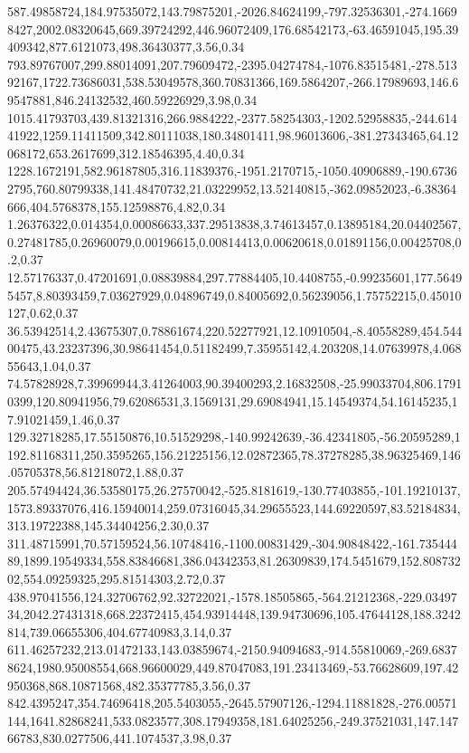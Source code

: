 587.49858724,184.97535072,143.79875201,-2026.84624199,-797.32536301,-274.16698427,2002.08320645,669.39724292,446.96072409,176.68542173,-63.46591045,195.39409342,877.6121073,498.36430377,3.56,0.34
793.89767007,299.88014091,207.79609472,-2395.04274784,-1076.83515481,-278.51392167,1722.73686031,538.53049578,360.70831366,169.5864207,-266.17989693,146.69547881,846.24132532,460.59226929,3.98,0.34
1015.41793703,439.81321316,266.9884222,-2377.58254303,-1202.52958835,-244.61441922,1259.11411509,342.80111038,180.34801411,98.96013606,-381.27343465,64.12068172,653.2617699,312.18546395,4.40,0.34
1228.1672191,582.96187805,316.11839376,-1951.2170715,-1050.40906889,-190.67362795,760.80799338,141.48470732,21.03229952,13.52140815,-362.09852023,-6.38364666,404.5768378,155.12598876,4.82,0.34
1.26376322,0.014354,0.00086633,337.29513838,3.74613457,0.13895184,20.04402567,0.27481785,0.26960079,0.00196615,0.00814413,0.00620618,0.01891156,0.00425708,0.2,0.37
12.57176337,0.47201691,0.08839884,297.77884405,10.4408755,-0.99235601,177.56495457,8.80393459,7.03627929,0.04896749,0.84005692,0.56239056,1.75752215,0.45010127,0.62,0.37
36.53942514,2.43675307,0.78861674,220.52277921,12.10910504,-8.40558289,454.54400475,43.23237396,30.98641454,0.51182499,7.35955142,4.203208,14.07639978,4.06855643,1.04,0.37
74.57828928,7.39969944,3.41264003,90.39400293,2.16832508,-25.99033704,806.17910399,120.80941956,79.62086531,3.1569131,29.69084941,15.14549374,54.16145235,17.91021459,1.46,0.37
129.32718285,17.55150876,10.51529298,-140.99242639,-36.42341805,-56.20595289,1192.81168311,250.3595265,156.21225156,12.02872365,78.37278285,38.96325469,146.05705378,56.81218072,1.88,0.37
205.57494424,36.53580175,26.27570042,-525.8181619,-130.77403855,-101.19210137,1573.89337076,416.15940014,259.07316045,34.29655523,144.69220597,83.52184834,313.19722388,145.34404256,2.30,0.37
311.48715991,70.57159524,56.10748416,-1100.00831429,-304.90848422,-161.73544489,1899.19549334,558.83846681,386.04342353,81.26309839,174.5451679,152.80873202,554.09259325,295.81514303,2.72,0.37
438.97041556,124.32706762,92.32722021,-1578.18505865,-564.21212368,-229.0349734,2042.27431318,668.22372415,454.93914448,139.94730696,105.47644128,188.3242814,739.06655306,404.67740983,3.14,0.37
611.46257232,213.01472133,143.03859674,-2150.94094683,-914.55810069,-269.68378624,1980.95008554,668.96600029,449.87047083,191.23413469,-53.76628609,197.42950368,868.10871568,482.35377785,3.56,0.37
842.4395247,354.74696418,205.5403055,-2645.57907126,-1294.11881828,-276.00571144,1641.82868241,533.0823577,308.17949358,181.64025256,-249.37521031,147.14766783,830.0277506,441.1074537,3.98,0.37
